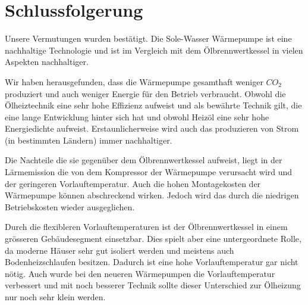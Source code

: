 \chapter{Schlussfolgerung}
\label{chap:fazit}

Unsere Vermutungen wurden bestätigt.
Die Sole-Wasser Wärmepumpe ist eine nachhaltige Technologie und ist im Vergleich
mit dem Ölbrennwertkessel in vielen Aspekten nachhaltiger.

Wir haben herausgefunden, dass die Wärmepumpe gesamthaft weniger $CO_2$
produziert und auch weniger Energie für den Betrieb verbraucht. 
Obwohl die Ölheiztechnik eine sehr hohe Effizienz aufweist und
als bewährte Technik gilt, die eine lange Entwicklung hinter sich hat und
obwohl Heizöl eine sehr hohe Energiedichte aufweist.
Erstaunlicherweise wird auch das produzieren von Strom (in bestimmten Ländern)
immer nachhaltiger.

Die Nachteile die sie gegenüber dem Ölbrennwertkessel aufweist, liegt
in der Lärmemission die von dem Kompressor der Wärmepumpe verursacht wird
und der geringeren Vorlauftemperatur. Auch die hohen Montagekosten der Wärmepumpe können abschreckend wirken. Jedoch wird das durch die niedrigen Betriebskosten wieder ausgeglichen.

Durch die flexibleren Vorlauftemperaturen ist der Ölbrennwertkessel in einem grösseren Gebäudesegment einsetzbar.
Dies spielt aber eine untergeordnete Rolle, da moderne Häuser sehr gut isoliert werden und meistens auch Bodenheizschlaufen besitzen. Dadurch ist eine hohe Vorlauftemperatur gar nicht nötig. Auch wurde bei den neueren Wärmepumpen die Vorlauftemperatur verbessert und mit noch besserer Technik sollte dieser Unterschied zur Ölheizung nur noch sehr klein werden.
